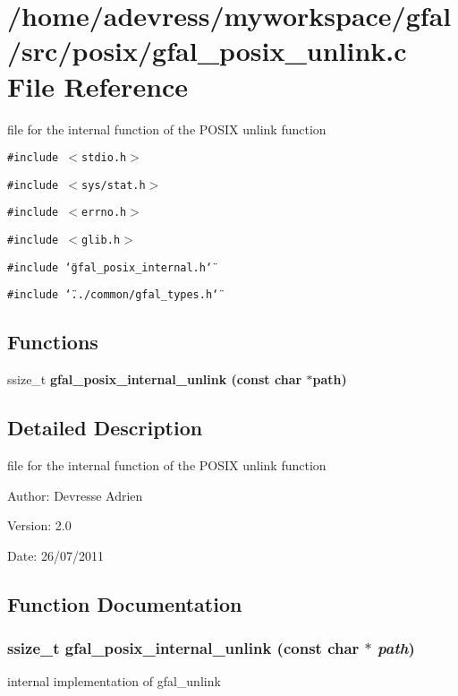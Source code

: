 \section{/home/adevress/myworkspace/gfal/src/posix/gfal\_\-posix\_\-unlink.c File Reference}
\label{gfal__posix__unlink_8c}
file for the internal function of the POSIX unlink function 

{\tt \#include $<$stdio.h$>$}\par
{\tt \#include $<$sys/stat.h$>$}\par
{\tt \#include $<$errno.h$>$}\par
{\tt \#include $<$glib.h$>$}\par
{\tt \#include \char`\"{}gfal\_\-posix\_\-internal.h\char`\"{}}\par
{\tt \#include \char`\"{}../common/gfal\_\-types.h\char`\"{}}\par
\subsection*{Functions}
\begin{CompactItemize}
\item 
ssize\_\-t \bf{gfal\_\-posix\_\-internal\_\-unlink} (const char $\ast$path)
\end{CompactItemize}


\subsection{Detailed Description}
file for the internal function of the POSIX unlink function 

\begin{Desc}
\item[Author:]Devresse Adrien \end{Desc}
\begin{Desc}
\item[Version:]2.0 \end{Desc}
\begin{Desc}
\item[Date:]26/07/2011 \end{Desc}


\subsection{Function Documentation}
\subsubsection{\setlength{\rightskip}{0pt plus 5cm}ssize\_\-t gfal\_\-posix\_\-internal\_\-unlink (const char $\ast$ {\em path})}\label{gfal__posix__unlink_8c_7facf305283ec9fd77f0df1c99d8dfa8}


internal implementation of gfal\_\-unlink 